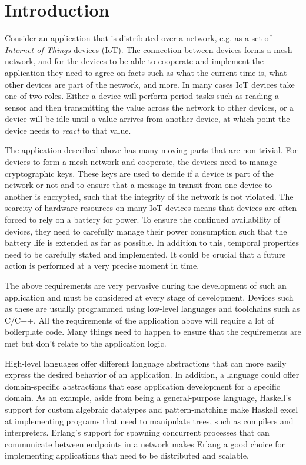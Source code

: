 \chapter{Introduction}
\label{chap:introduction}

Consider an application that is distributed over a network, e.g. as a set of \textit{Internet of Things}-devices (IoT). The
connection between devices forms a mesh network, and for the devices to be able to cooperate and implement the application they
need to agree on facts such as what the current time is, what other devices are part of the network, and more. In many cases
IoT devices take one of two roles. Either a device will perform period tasks such as reading a sensor and then transmitting
the value across the network to other devices, or a device will be idle until a value arrives from another device, at which point
the device needs to \textit{react} to that value.

The application described above has many moving parts that are non-trivial. For devices to form a mesh network
and cooperate, the devices need to manage cryptographic keys. These keys are used to decide if a device is part of the network
or not and to ensure that a message in transit from one device to another is encrypted, such that the integrity of the network
is not violated. The scarcity of hardware resources on many IoT devices means that devices are often forced to rely on a battery for power.
To ensure the continued availability of devices, they need to carefully manage their power consumption such that the
battery life is extended as far as possible. In addition to this, temporal properties need to be carefully stated and implemented.
It could be crucial that a future action is performed at a very precise moment in time.

The above requirements are very pervasive during the development of such an application and must be considered at every stage of
development. Devices such as these are usually programmed using low-level languages and toolchains such as C/C++. All the
requirements of the application above will require a lot of boilerplate code. Many things need to
happen to ensure that the requirements are met but don't relate to the application logic.

High-level languages offer different language abstractions that can more easily express the desired behavior of an application.
In addition, a language could offer domain-specific abstractions that ease application development for a specific domain.
As an example, aside from being a general-purpose language, Haskell's support for custom algebraic datatypes and pattern-matching
make Haskell excel at implementing programs that need to manipulate trees, such as compilers and interpreters. Erlang's support
for spawning concurrent processes that can communicate between endpoints in a network makes Erlang a good choice for implementing
applications that need to be distributed and scalable.

